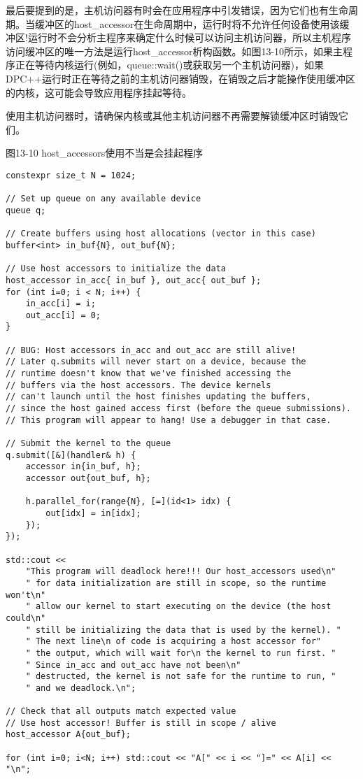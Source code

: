 最后要提到的是，主机访问器有时会在应用程序中引发错误，因为它们也有生命周期。当缓冲区的host\_accessor在生命周期中，运行时将不允许任何设备使用该缓冲区!运行时不会分析主程序来确定什么时候可以访问主机访问器，所以主机程序访问缓冲区的唯一方法是运行host\_accessor析构函数。如图13-10所示，如果主程序正在等待内核运行(例如，queue::wait()或获取另一个主机访问器)，如果DPC++运行时正在等待之前的主机访问器销毁，在销毁之后才能操作使用缓冲区的内核，这可能会导致应用程序挂起等待。\par

\begin{tcolorbox}[colback=red!5!white,colframe=red!75!black]
使用主机访问器时，请确保内核或其他主机访问器不再需要解锁缓冲区时销毁它们。
\end{tcolorbox}

\hspace*{\fill} \par %
图13-10 host\_accessors使用不当是会挂起程序
\begin{lstlisting}[caption={}]
constexpr size_t N = 1024;

// Set up queue on any available device
queue q;

// Create buffers using host allocations (vector in this case)
buffer<int> in_buf{N}, out_buf{N};

// Use host accessors to initialize the data
host_accessor in_acc{ in_buf }, out_acc{ out_buf };
for (int i=0; i < N; i++) {
	in_acc[i] = i;
	out_acc[i] = 0;
}

// BUG: Host accessors in_acc and out_acc are still alive!
// Later q.submits will never start on a device, because the
// runtime doesn't know that we've finished accessing the
// buffers via the host accessors. The device kernels
// can't launch until the host finishes updating the buffers,
// since the host gained access first (before the queue submissions).
// This program will appear to hang! Use a debugger in that case.

// Submit the kernel to the queue
q.submit([&](handler& h) {
	accessor in{in_buf, h};
	accessor out{out_buf, h};
	
	h.parallel_for(range{N}, [=](id<1> idx) {
		out[idx] = in[idx];
	});
});

std::cout <<
	"This program will deadlock here!!! Our host_accessors used\n"
	" for data initialization are still in scope, so the runtime won't\n"
	" allow our kernel to start executing on the device (the host could\n"
	" still be initializing the data that is used by the kernel). "
	" The next line\n of code is acquiring a host accessor for"
	" the output, which will wait for\n the kernel to run first. "
	" Since in_acc and out_acc have not been\n"
	" destructed, the kernel is not safe for the runtime to run, "
	" and we deadlock.\n";
	
// Check that all outputs match expected value
// Use host accessor! Buffer is still in scope / alive
host_accessor A{out_buf};

for (int i=0; i<N; i++) std::cout << "A[" << i << "]=" << A[i] << "\n";
\end{lstlisting}
